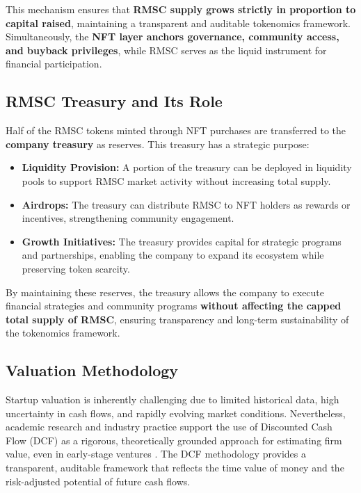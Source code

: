 \documentclass[conference]{IEEEtran}
\begin{document}
This mechanism ensures that \textbf{RMSC supply grows strictly in proportion to capital raised}, maintaining a transparent and auditable tokenomics framework. Simultaneously, the \textbf{NFT layer anchors governance, community access, and buyback privileges}, while RMSC serves as the liquid instrument for financial participation.

\subsection{RMSC Treasury and Its Role}

Half of the RMSC tokens minted through NFT purchases are transferred to the \textbf{company treasury} as reserves. This treasury has a strategic purpose:

\begin{itemize}
    \item \textbf{Liquidity Provision:} A portion of the treasury can be deployed in liquidity pools to support RMSC market activity without increasing total supply.
    \item \textbf{Airdrops:} The treasury can distribute RMSC to NFT holders as rewards or incentives, strengthening community engagement.
    \item \textbf{Growth Initiatives:} The treasury provides capital for strategic programs and partnerships, enabling the company to expand its ecosystem while preserving token scarcity.
\end{itemize}

By maintaining these reserves, the treasury allows the company to execute financial strategies and community programs \textbf{without affecting the capped total supply of RMSC}, ensuring transparency and long-term sustainability of the tokenomics framework.


\subsection{Valuation Methodology}
Startup valuation is inherently challenging due to limited historical data, high uncertainty in cash flows, and rapidly evolving market conditions. Nevertheless, academic research and industry practice support the use of Discounted Cash Flow (DCF) as a rigorous, theoretically grounded approach for estimating firm value, even in early-stage ventures \cite{Laitinen2019,Olsen2019,Arefmanesh2025,Montani2020,Steiger2010}. The DCF methodology provides a transparent, auditable framework that reflects the time value of money and the risk-adjusted potential of future cash flows.
\end{document}
